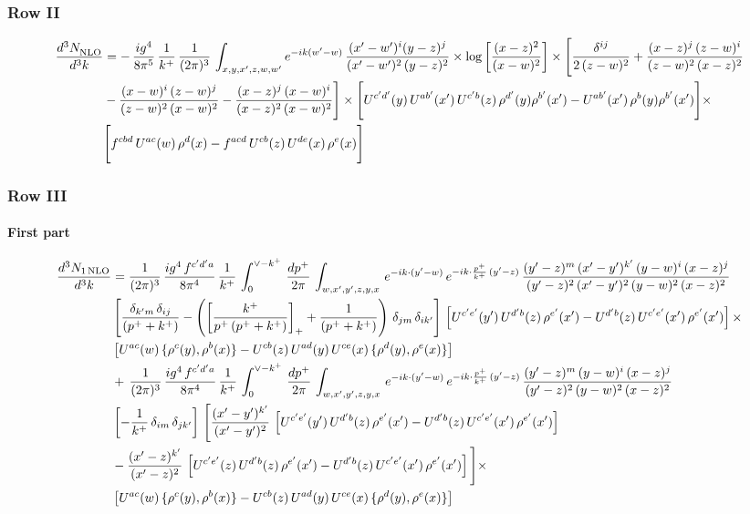 \documentclass[9pt]{article}
\numberwithin{equation}{section}
\begin{document}
\subsubsection{Row II}
\begin{align}
     \frac{d^{3}N_{\rm NLO}^{\rm}}{d^{3}k}  & =    
 -\,\frac{ig^{4}}{8\pi^{5}}\,\frac{1}{k^{+}}\,\frac{1}{(2\pi)^{3}}\, \int_{x,y,x',z,w,w^{\prime}} e^{-ik(w^{\prime}-w)}\,\frac{(x'-w')^{i}(y-z)^{j}}{(x'-w')^{2}\,(y-z)^{2}}\times \log{\left[\frac{(x-z)^{2}}{(x-w)^{2}}\right]}\times \Bigg[\frac{\delta^{ij}}{2\,(z-w)^{2}}+\frac{(x-z)^{j}\,(z-w)^{i}}{(z-w)^{2}\,(x-z)^{2}}\notag \\ & -\frac{(x-w)^{i}\,(z-w)^{j}}{(z-w)^{2}\,(x-w)^{2}}-\frac{(x-z)^{j}\,(x-w)^{i}}{(x-z)^{2}\,(x-w)^{2}}\Bigg]\times \Bigg[U^{c'd'}(y)\,U^{ab'}(x')\,U^{c'b}(z)\,\rho^{d'}(y)\rho^{b'}(x')-U^{ab'}(x')\,\rho^{b}(y)\rho^{b'}(x')\Bigg]\times\notag \\ & \Bigg[f^{cbd}\,U^{ac}(w)\,\rho^{d}(x)-f^{acd}\, U^{cb}(z)\,U^{de}(x)\,\rho^{e}(x)\Bigg]
\end{align}
 \subsubsection{Row III}
\paragraph{First part}
\begin{align}
     \frac{d^{3}N_{1\,\rm NLO}}{d^{3}k} & =  \frac{1}{(2\pi)^{3}}\, \frac{ig^{4}\,f^{c'd'a}}{8\pi^{4}}\, \frac{1}{k^{+}}\,\int_{0}^{\vee-k^{+}}\,  \frac{dp^{+}}{2\pi}\, \int_{w,x',y',z,y,x}\, e^{-ik\cdot (y'-w)}\, e^{-ik\cdot \frac{p^{+}}{k^{+}}\,(y'-z)}\,\frac{(y'-z)^{m}\,(x'-y')^{k'}\,(y-w)^{i}\,(x-z)^{j}}{(y'-z)^{2}\,(x'-y')^{2}\,(y-w)^{2}\,(x-z)^{2}}\notag \\ & \left[\frac{\delta_{k'm}\,\delta_{ij}}{(p^{+}+k^{+})}-\left(\left[\frac{k^{+}}{p^{+}\,(p^{+}+k^{+})}\right]_{+}+\frac{1}{(p^{+}+k^{+})}\right)\,\delta_{jm}\,\delta_{ik'}\right]\, \left[U^{c'e'}(y')\,U^{d'b}(z)\,\rho^{e'}(x')-U^{d'b}(z)\,U^{c'e'}(x')\,\rho^{e'}(x')\right]\times\notag \\ &  \left[U^{ac}(w)\, \{\rho^{c}(y),\rho^{b}(x)\}-U^{cb}(z)\,U^{ad}(y)\,U^{ce}(x)\,\{\rho^{d}(y),\rho^{e}(x)\}\right] \notag \\
&  +\,\frac{1}{(2\pi)^{3}}\, \frac{ig^{4}\,f^{c'd'a}}{8\pi^{4}}\, \frac{1}{k^{+}}\,\int_{0}^{\vee-k^{+}}\,  \frac{dp^{+}}{2\pi}\, \int_{w,x',y',z,y,x}\, e^{-ik\cdot (y'-w)}\, e^{-ik\cdot \frac{p^{+}}{k^{+}}\,(y'-z)}\,\frac{(y'-z)^{m}\,(y-w)^{i}\,(x-z)^{j}}{(y'-z)^{2}\,(y-w)^{2}\,(x-z)^{2}}\notag \\ &   \left[-\frac{1}{k^{+}}\, \delta_{im}\, \delta_{jk'}\right]\, \Bigg[\frac{(x'-y')^{k'}}{(x'-y')^{2}}\,\left[U^{c'e'}(y')\,U^{d'b}(z)\,\rho^{e'}(x')-U^{d'b}(z)\,U^{c'e'}(x')\,\rho^{e'}(x')\right]\notag \\ & -\frac{(x'-z)^{k'}}{(x'-z)^{2}}\,\left[U^{c'e'}(z)\,U^{d'b}(z)\,\rho^{e'}(x')-U^{d'b}(z)\,U^{c'e'}(x')\,\rho^{e'}(x')\right]\Bigg]\times\notag \\ &   \left[U^{ac}(w)\, \{\rho^{c}(y),\rho^{b}(x)\}-U^{cb}(z)\,U^{ad}(y)\,U^{ce}(x)\,\{\rho^{d}(y),\rho^{e}(x)\}\right]
\end{align}
\end{document}
